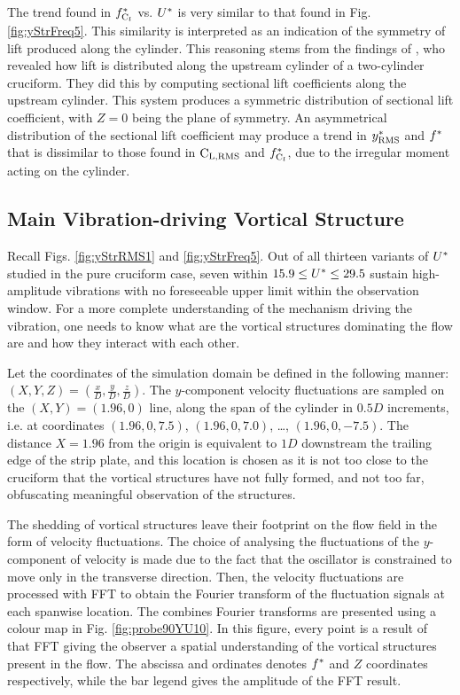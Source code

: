 \documentclass[oneside]{utmthesis}
\begin{document}
The trend found in $f_{\text{C}_{l}}^{*}$ vs. $U^{*}$ is very similar to that found in Fig. \ref{fig:yStrFreq5}. This similarity is interpreted as an indication of the symmetry of lift produced along the cylinder. This reasoning stems from the findings of \citet{Zhao2018a}, who revealed how lift is distributed along the upstream cylinder of a two-cylinder \angfi{} cruciform. They did this by computing sectional lift coefficients along the upstream cylinder. This system produces a symmetric distribution of sectional lift coefficient, with $Z = 0$ being the plane of symmetry. An asymmetrical distribution of the sectional lift coefficient may produce a trend in $y^{*}_{\text{RMS}}$ and $f^{*}$ that is dissimilar to those found in $\text{C}_{\text{L,RMS}}$ and $f_{\text{C}_{l}}^{*}$, due to the irregular moment acting on the cylinder.

\subsection{Main Vibration-driving Vortical Structure}\label{ssec:svivRegimeVortStruct}
Recall Figs. \ref{fig:yStrRMS1} and \ref{fig:yStrFreq5}. Out of all thirteen variants of $U^{*}$ studied in the pure cruciform case, seven within $15.9 \leq U^{*} \leq 29.5$ sustain high-amplitude vibrations with no foreseeable upper limit within the observation window. For a more complete understanding of the mechanism driving the vibration, one needs to know what are the vortical structures dominating the flow are and how they interact with each other.

Let the coordinates of the simulation domain be defined in the following manner: $\left( X, Y, Z \right) = \left( \frac{x}{D}, \frac{y}{D}, \frac{z}{D} \right)$. The $y$-component velocity fluctuations are sampled on the $\left ( X, Y \right ) = \left ( 1.96, 0 \right )$ line, along the span of the cylinder in $0.5D$ increments, i.e. at coordinates $\left ( 1.96, 0, 7.5 \right )$, $\left ( 1.96, 0, 7.0 \right )$, \dots, $\left ( 1.96, 0, -7.5 \right )$. The distance $X = 1.96$ from the origin is equivalent to $1D$ downstream the trailing edge of the strip plate, and this location is chosen as it is not too close to the cruciform that the vortical structures have not fully formed, and not too far, obfuscating meaningful observation of the structures.

The shedding of vortical structures leave their footprint on the flow field in the form of velocity fluctuations. The choice of analysing the fluctuations of the $y$-component of velocity is made due to the fact that the oscillator is constrained to move only in the transverse direction. Then, the velocity fluctuations are processed with FFT to obtain the Fourier transform of the fluctuation signals at each spanwise location. The combines Fourier transforms are presented using a colour map in Fig. \ref{fig:probe90YU10}. In this figure, every point is a result of that FFT giving the observer a spatial understanding of the vortical structures present in the flow. The abscissa and ordinates denotes $f^{*}$ and $Z$ coordinates respectively, while the bar legend gives the amplitude of the FFT result.
\end{document}
